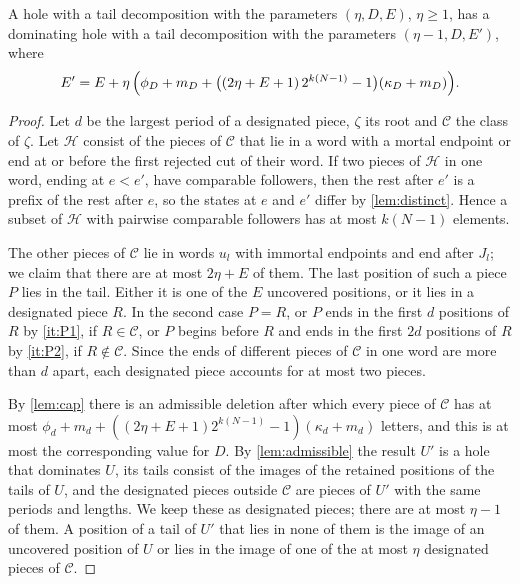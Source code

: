 \begin{lemma}\label{lem:pass}
A hole with a tail decomposition with the parameters $(\eta,D,E)$,
$\eta\ge1$, has a dominating hole with a tail decomposition with the
parameters $(\eta-1,D,E')$, where
\[
  E'=E+\eta\,\Bigl(\phi_D+m_D+\bigl((2\eta+E+1)\,2^{k(N-1)}-1\bigr)
  (\kappa_D+m_D)\Bigr).
\]
\end{lemma}

\begin{proof}
Let $d$ be the largest period of a designated piece, $\zeta$ its root and
$\mathcal C$ the class of $\zeta$. Let $\mathcal H$ consist of the pieces of
$\mathcal C$ that lie in a word with a mortal endpoint or end at or before
the first rejected cut of their word. If two pieces of $\mathcal H$ in one
word, ending at $e<e'$, have comparable followers, then the rest after $e'$
is a prefix of the rest after $e$, so the states at $e$ and $e'$ differ by
\cref{lem:distinct}. Hence a subset of $\mathcal H$ with pairwise
comparable followers has at most $k(N-1)$ elements.

The other pieces of $\mathcal C$ lie in words $u_l$ with immortal endpoints
and end after $J_l$; we claim that there are at most $2\eta+E$ of them. The
last position of such a piece $P$ lies in the tail. Either it is one of the
$E$ uncovered positions, or it lies in a designated piece $R$. In the second
case $P=R$, or $P$ ends in the first $d$ positions of $R$ by \ref{it:P1},
if $R\in\mathcal C$, or $P$ begins before $R$ and ends in the first $2d$
positions of $R$ by \ref{it:P2}, if $R\notin\mathcal C$. Since the ends of
different pieces of $\mathcal C$ in one word are more than $d$ apart, each
designated piece accounts for at most two pieces.

By \cref{lem:cap} there is an admissible deletion after which every piece
of $\mathcal C$ has at most $\phi_d+m_d+((2\eta+E+1)2^{k(N-1)}-1)(\kappa_d+
m_d)$ letters, and this is at most the corresponding value for $D$. By
\cref{lem:admissible} the result $U'$ is a hole that dominates $U$, its
tails consist of the images of the retained positions of the tails of $U$,
and the designated pieces outside $\mathcal C$ are pieces of $U'$ with the
same periods and lengths. We keep these as designated pieces; there are at
most $\eta-1$ of them. A position of a tail of $U'$ that lies in none of them
is the image of an uncovered position of $U$ or lies in the image of one of
the at most $\eta$ designated pieces of $\mathcal C$.
\end{proof}

